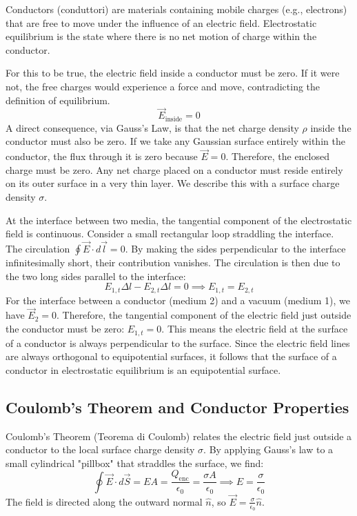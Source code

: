 Conductors (conduttori) are materials containing mobile charges (e.g., electrons) that are free to move under the influence of an electric field. Electrostatic equilibrium is the state where there is no net motion of charge within the conductor.

For this to be true, the electric field inside a conductor must be zero. If it were not, the free charges would experience a force and move, contradicting the definition of equilibrium.
\[ \vec{E}_{\text{inside}} = 0 \]
A direct consequence, via Gauss's Law, is that the net charge density \(\rho\) inside the conductor must also be zero. If we take any Gaussian surface entirely within the conductor, the flux through it is zero because \(\vec{E}=0\). Therefore, the enclosed charge must be zero. Any net charge placed on a conductor must reside entirely on its outer surface in a very thin layer. We describe this with a surface charge density \(\sigma\).

At the interface between two media, the tangential component of the electrostatic field is continuous. Consider a small rectangular loop straddling the interface. The circulation \(\oint \vec{E} \cdot d\vec{l} = 0\). By making the sides perpendicular to the interface infinitesimally short, their contribution vanishes. The circulation is then due to the two long sides parallel to the interface:
\[ E_{1,t} \Delta l - E_{2,t} \Delta l = 0 \implies E_{1,t} = E_{2,t} \]
For the interface between a conductor (medium 2) and a vacuum (medium 1), we have \(\vec{E}_2 = 0\). Therefore, the tangential component of the electric field just outside the conductor must be zero: \(E_{1,t} = 0\). This means the electric field at the surface of a conductor is always perpendicular to the surface.
Since the electric field lines are always orthogonal to equipotential surfaces, it follows that the surface of a conductor in electrostatic equilibrium is an equipotential surface.

\subsection*{Coulomb's Theorem and Conductor Properties}

Coulomb's Theorem (Teorema di Coulomb) relates the electric field just outside a conductor to the local surface charge density \(\sigma\). By applying Gauss's law to a small cylindrical "pillbox" that straddles the surface, we find:
\[ \oint \vec{E} \cdot d\vec{S} = E A = \frac{Q_{\text{enc}}}{\epsilon_0} = \frac{\sigma A}{\epsilon_0} \implies E = \frac{\sigma}{\epsilon_0} \]
The field is directed along the outward normal \(\hat{n}\), so \(\vec{E} = \frac{\sigma}{\epsilon_0} \hat{n}\).

